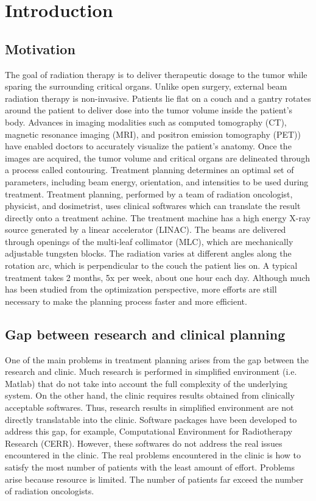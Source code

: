 \chapter{Introduction} \label{chap1}

\section{Motivation}

The goal of radiation therapy is to deliver therapeutic dosage to the tumor while sparing the surrounding critical organs. Unlike open surgery, external beam radiation therapy is non-invasive. Patients lie flat on a couch and a gantry rotates around the patient to deliver dose into the tumor volume inside the patient's body. Advances in imaging modalities such as computed tomography (CT), magnetic resonance imaging (MRI), and positron emission tomography (PET)) have enabled doctors to accurately visualize the patient's anatomy. Once the images are acquired, the tumor volume and critical organs are delineated through a process called contouring. Treatment planning determines an optimal set of parameters, including beam energy, orientation, and intensities to be used during treatment. Treatment planning, performed by a team of radiation oncologist, physicist, and dosimetrist, uses clinical softwares which can translate the result directly onto a treatment achine. The treatment machine has a high energy X-ray source generated by a linear accelerator (LINAC). The beams are delivered through openings of the multi-leaf collimator (MLC), which are mechanically adjustable tungsten blocks. The radiation varies at different angles along the rotation arc, which is perpendicular to the couch the patient lies on. A typical treatment takes 2 months, 5x per week, about one hour each day. Although much has been studied from the  optimization perspective, more efforts are still necessary to make the planning process faster and more efficient.   

\section{Gap between research and clinical planning}
One of the main problems in treatment planning arises from the gap between the research and clinic. Much research is performed in simplified environment (i.e. Matlab) that do not take into account the full complexity of the underlying system. On the other hand, the clinic requires results obtained from clinically acceptable softwares. Thus, research results in simplified environment are not directly translatable into the clinic. Software packages have been developed to address this gap, for example, Computational Environment for Radiotherapy Research (CERR). However, these softwares do not address the real issues encountered in the clinic. The real problems encountered in the clinic is how to satisfy the most number of patients with the least amount of effort. Problems arise because resource is limited. The number of patients far exceed the number of radiation oncologists. 